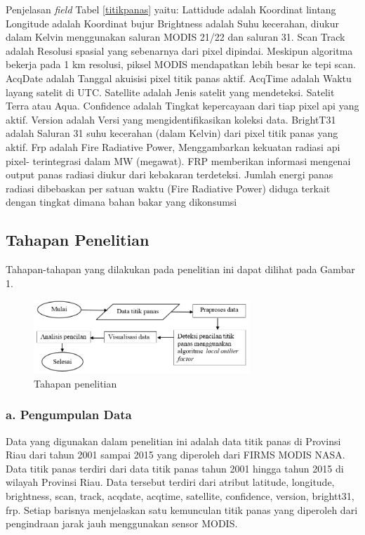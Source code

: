 Penjelasan \textit{field}  Tabel \ref{titikpanas} yaitu:
Lattidude adalah Koordinat lintang
Longitude adalah Koordinat bujur 
Brightness adalah Suhu kecerahan, diukur dalam Kelvin menggunakan saluran MODIS 
21/22 dan saluran 31.
Scan Track adalah Resolusi spasial yang sebenarnya dari pixel dipindai. Meskipun algoritma 
bekerja pada 1 km resolusi, piksel MODIS mendapatkan lebih besar ke tepi 
scan.
AcqDate	adalah Tanggal akuisisi pixel titik panas aktif.
AcqTime	adalah Waktu layang satelit di UTC.
Satellite adalah Jenis satelit yang mendeteksi. Satelit Terra atau Aqua.
Confidence adalah Tingkat kepercayaan dari tiap pixel api yang aktif.
Version	adalah Versi yang mengidentifikasikan koleksi data.
BrightT31 adalah Saluran 31 suhu kecerahan (dalam Kelvin) dari pixel titik panas yang aktif.
Frp adalah Fire Radiative Power, Menggambarkan kekuatan radiasi api pixel-
terintegrasi dalam MW (megawat). FRP memberikan informasi mengenai output panas radiasi diukur dari kebakaran terdeteksi. Jumlah energi panas radiasi dibebaskan per satuan waktu (Fire Radiative Power) diduga terkait dengan tingkat dimana bahan bakar yang dikonsumsi


\subsection*{Tahapan Penelitian}
Tahapan-tahapan yang dilakukan pada penelitian ini dapat dilihat pada Gambar 1.

\begin{figure}[h!] %
\centering
\includegraphics[width=230pt]{tahapanPenelitian.png}
\caption{Tahapan penelitian}
\label{fig:tahapan}
\end{figure}

\subsubsection*{a. Pengumpulan Data}
Data yang digunakan dalam penelitian ini adalah data titik panas di Provinsi Riau dari tahun 2001 sampai 2015 yang diperoleh dari FIRMS MODIS NASA. Data titik panas terdiri dari data titik panas tahun 2001 hingga tahun 2015 di wilayah Provinsi Riau. Data tersebut terdiri dari atribut latitude, longitude, brightness, scan, track, acqdate, acqtime, satellite, confidence, version, brightt31, frp. Setiap barisnya menjelaskan satu kemunculan titik panas yang diperoleh dari pengindraan jarak jauh menggunakan sensor MODIS. 
	 

